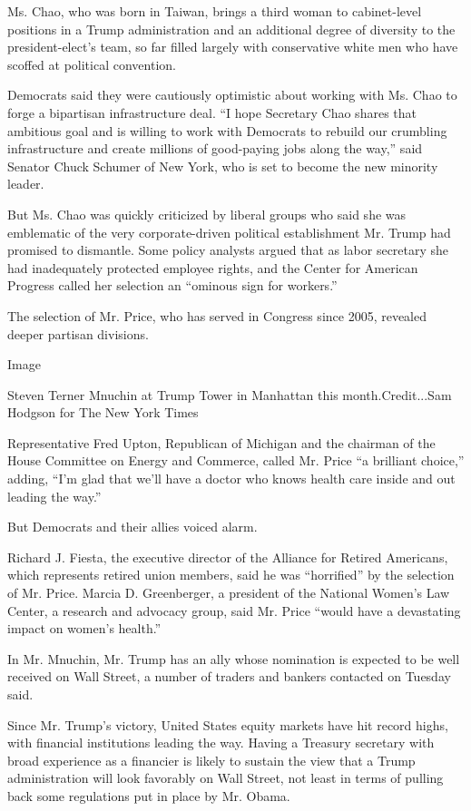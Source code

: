 Ms. Chao, who was born in Taiwan, brings a third woman to cabinet-level
positions in a Trump administration and an additional degree of
diversity to the president-elect's team, so far filled largely with
conservative white men who have scoffed at political convention.

Democrats said they were cautiously optimistic about working with Ms.
Chao to forge a bipartisan infrastructure deal. ``I hope Secretary Chao
shares that ambitious goal and is willing to work with Democrats to
rebuild our crumbling infrastructure and create millions of good-paying
jobs along the way,'' said Senator Chuck Schumer of New York, who is set
to become the new minority leader.

But Ms. Chao was quickly criticized by liberal groups who said she was
emblematic of the very corporate-driven political establishment Mr.
Trump had promised to dismantle. Some policy analysts argued that as
labor secretary she had inadequately protected employee rights, and the
Center for American Progress called her selection an ``ominous sign for
workers.''

The selection of Mr. Price, who has served in Congress since 2005,
revealed deeper partisan divisions.

Image

Steven Terner Mnuchin at Trump Tower in Manhattan this
month.Credit...Sam Hodgson for The New York Times

Representative Fred Upton, Republican of Michigan and the chairman of
the House Committee on Energy and Commerce, called Mr. Price ``a
brilliant choice,'' adding, ``I'm glad that we'll have a doctor who
knows health care inside and out leading the way.''

But Democrats and their allies voiced alarm.

Richard J. Fiesta, the executive director of the Alliance for Retired
Americans, which represents retired union members, said he was
``horrified'' by the selection of Mr. Price. Marcia D. Greenberger, a
president of the National Women's Law Center, a research and advocacy
group, said Mr. Price ``would have a devastating impact on women's
health.''

In Mr. Mnuchin, Mr. Trump has an ally whose nomination is expected to be
well received on Wall Street, a number of traders and bankers contacted
on Tuesday said.

Since Mr. Trump's victory, United States equity markets have hit record
highs, with financial institutions leading the way. Having a Treasury
secretary with broad experience as a financier is likely to sustain the
view that a Trump administration will look favorably on Wall Street, not
least in terms of pulling back some regulations put in place by Mr.
Obama.

